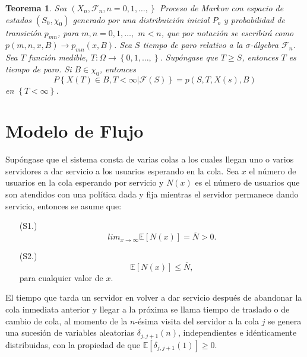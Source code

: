 \documentclass{article}
\newtheorem{Teo}{Teorema}[section]
\newcommand{\esp}{\mathbb{E}}
\numberwithin{equation}{section}
\begin{document}
\begin{Teo}
Sea $\left(X_{n},\mathcal{F}_{n},n=0,1,\ldots,\right\}$ Proceso de Markov con espacio de estados $\left(S_{0},\chi_{0}\right)$ generado por una distribuici\'on inicial $P_{o}$ y probabilidad de transici\'on $p_{mn}$, para $m,n=0,1,\ldots,$ $m<n$, que por notaci\'on se escribir\'a como $p\left(m,n,x,B\right)\rightarrow p_{mn}\left(x,B\right)$. Sea $S$ tiempo de paro relativo a la $\sigma$-\'algebra $\mathcal{F}_{n}$. Sea $T$ funci\'on medible, $T:\Omega\rightarrow\left\{0,1,\ldots,\right\}$. Sup\'ongase que $T\geq S$, entonces $T$ es tiempo de paro. Si $B\in\chi_{0}$, entonces
\begin{equation}\label{Prop.Fuerte.Markov}
P\left\{X\left(T\right)\in B,T<\infty|\mathcal{F}\left(S\right)\right\} = p\left(S,T,X\left(s\right),B\right)
\end{equation}
en $\left\{T<\infty\right\}$.
\end{Teo}

\section{Modelo de Flujo}




Sup\'ongase que el sistema consta de varias colas a los cuales llegan uno o varios servidores a dar servicio a los usuarios esperando en la cola. Sea $x$ el n\'umero de usuarios en la cola esperando por servicio y $N\left(x\right)$ es el n\'umero de usuarios que son atendidos con una pol\'itica dada y fija mientras el servidor permanece dando servicio, entonces se asume que:
\begin{itemize}
\item[(S1.)]
\begin{equation}\label{S1}
lim_{x\rightarrow\infty}\esp\left[N\left(x\right)\right]=\overline{N}>0.
\end{equation}
\item[(S2.)]
\begin{equation}\label{S2}
\esp\left[N\left(x\right)\right]\leq \overline{N},
\end{equation}
para cualquier valor de $x$.
\end{itemize}

El tiempo que tarda un servidor en volver a dar servicio despu\'es de abandonar la cola inmediata anterior y llegar a la pr\'oxima se llama tiempo de traslado o de cambio  de cola, al momento de la $n$-\'esima visita del servidor a la cola $j$ se genera una sucesi\'on de variables aleatorias $\delta_{j,j+1}\left(n\right)$, independientes e id\'enticamente distribuidas, con la propiedad de que $\esp\left[\delta_{j,j+1}\left(1\right)\right]\geq0$.\\
\end{document}
